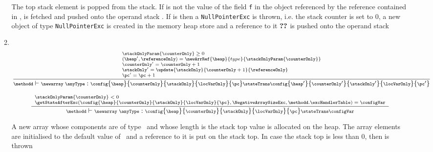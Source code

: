 \begin{itemize}
\begin{enumerate}
	The top stack element \stackOnlyParam{\counterOnly}  is popped from the stack. If \stackOnlyParam{\counterOnly} is not \Mynull the value of the field \texttt{f}
	in the object referenced by the reference contained in \stackOnlyParam{\counterOnly}, is fetched and pushed onto the operand stack \stackOnlyParam{\counterOnly}.
        If \stackOnlyParam{\counterOnly} is \Mynull then a \texttt{NullPointerExc} is thrown, i.e. the stack counter is set to 0, a new object of type
	\texttt{NullPointerExc} is created in the memory heap store \heap and a reference to it $\Ref{NullPointerExc}$ is pushed onto the operand stack					 
			
        \item  \newarray  \ \anyType \\
	        $${\scriptsize \frac{\begin{array}{l}
		               \stackOnlyParam{\counterOnly} \geq 0  \\
			                    (\heap',\referenceOnly ) = \newArrRef{\heap}{type}{\stackOnlyParam{\counterOnly}}\\
					    \counterOnly' = \counterOnly + 1\\
					    \stackOnly' = \update{\stackOnly}{\counterOnly +  1}{\referenceOnly } \\
					    \pc' = \pc + 1
			       \end{array}  }
                {\methodd \vdash  \newarray \ \anyType :  \config{\heap}{\counterOnly}{\stackOnly}{\locVarOnly}{\pc} 
		               \stateTrans  
			       \config{\heap'}
			              {\counterOnly'}
				      {\stackOnly' }
				      {\locVarOnly}
				      {\pc'}  } } $$

	  
	        $${\scriptsize \frac{\begin{array}{l}
		               \stackOnlyParam{\counterOnly} < 0 \\
			       \getStateAfterExc( \config{\heap}{\counterOnly}{\stackOnly}{\locVarOnly}{\pc}, \NegativeArraySizeExc,\methodd.\excHandlerTable ) =  \configVar                	        \end{array}  }
                {\methodd \vdash  \newarray \ \anyType :  \config{\heap}{\counterOnly}{\stackOnly}{\locVarOnly}{\pc} 
			                      \stateTrans  
					      \configVar } } $$
	  
	A new array whose components are of type \anyType \ and whose length is the stack top value is allocated on the heap.
	The array elements are initialised to the default value of  \anyType \ and a reference to it is put on the stack top. 
	In case the stack top is less than 0, then \NegativeArraySizeExc is thrown 


\end{enumerate}
\end{itemize}
